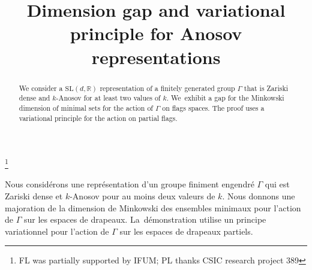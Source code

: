 \documentclass[JEP,XML,SOM,Unicode,NoEqCountersInSection,published]{cedram}
\begin{document}
\frontmatter

\title{Dimension gap and variational principle for Anosov representations}

\author[\initial{F.} \lastname{Ledrappier}]{ }
\address{Sorbonne Université, UMR 8001, LPSM,\\
Boîte Courrier 158, 4 Place Jussieu, 75252 Paris cedex
05, France}
\urladdr{}

\author[\initial{P.} \lastname{Lessa}]{ }
\address{CMAT, Facultad de Ciencias,\\
Iguá 4225, 11400 Montevideo, Uruguay}

\thanks{FL was partially supported by IFUM; PL thanks CSIC research project 389}

\begin{abstract}
We consider a \(\mathrm{SL} (d,\mathbb{R})\) representation of a finitely generated group \(\Gamma\) that is Zariski dense and \(k\)-Anosov for at least two values of \(k\). We~exhibit a gap for the Minkowski dimension of minimal sets for the action of \(\Gamma\) on flags spaces. The proof uses a variational principle for the action on partial flags.
\end{abstract}





\begin{altabstract}
Nous considérons une représentation d’un groupe finiment engendré $\Gamma$ qui est Zariski dense et $k$-Anosov pour au moins deux valeurs de $k$. Nous donnons une majoration de la dimension de Minkowski des ensembles minimaux pour l’action de $\Gamma$ sur les espaces de drapeaux. La~démonstration utilise un principe variationnel pour l’action de $\Gamma$ sur les espaces de drapeaux partiels.
\end{altabstract}

\maketitle
\vspace*{-\baselineskip}
\tableofcontents
\mainmatter
\end{document}
